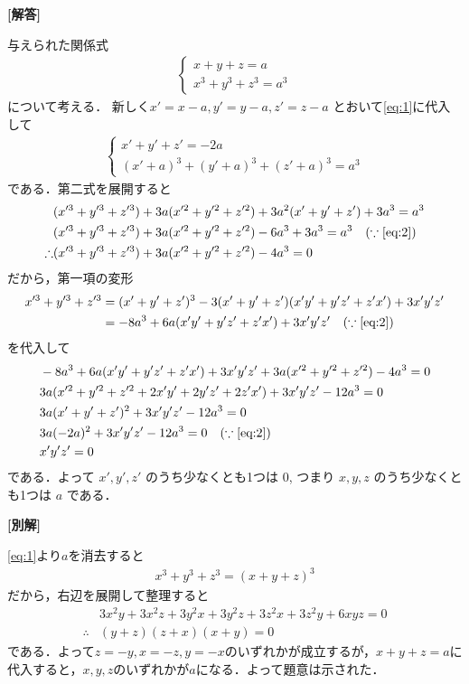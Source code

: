 \documentclass[../../main.tex]{subfiles}
\begin{document}
\begin{oframed}
  
\end{oframed}

{\bf [解答]}

与えられた関係式
\begin{align}
  \begin{cases}
    x + y + z = a \\
    x^3+y^3+z^3 = a^3
  \end{cases} \label{eq:1}
\end{align}
について考える．
新しく$x' = x-a, y' = y-a, z' = z-a$ とおいて\cref{eq:1}に代入して
\begin{align}
  \begin{cases}
    x' + y' + z' = -2a \\
    (x'+a)^3 + (y'+a)^3 + (z'+a)^3 = a^3
  \end{cases} \label{eq:2}
\end{align}
である．第二式を展開すると
\begin{align}
  & (x'^3+y'^3+z'^3) + 3a(x'^2+y'^2+z'^2)+3a^2(x'+y'+z')+3a^3 = a^3 \\
  & (x'^3+y'^3+z'^3) + 3a(x'^2+y'^2+z'^2)-6a^3+3a^3 = a^3 \quad (\because\text{\cref{eq:2}}) \\
  \therefore
  & (x'^3+y'^3+z'^3) + 3a(x'^2+y'^2+z'^2)-4a^3 = 0 \label{eq:3}
\end{align}
だから，第一項の変形
\begin{align}
  x'^3+y'^3+z'^3
  & = (x'+y'+z')^3 - 3(x'+y'+z')(x'y'+y'z'+z'x') + 3x'y'z' \\
  & = -8a^3 + 6a(x'y'+y'z'+z'x') + 3x'y'z' \quad (\because\text{\cref{eq:2}})
\end{align}
を代入して
\begin{align}
  & -8a^3 + 6a(x'y'+y'z'+z'x') + 3x'y'z' + 3a(x'^2+y'^2+z'^2)-4a^3 = 0 \\
  & 3a(x'^2+y'^2+z'^2+2x'y'+2y'z'+2z'x') + 3x'y'z' - 12a^3 = 0 \\
  & 3a(x'+y'+z')^2 + 3x'y'z' - 12a^3 = 0 \\
  & 3a(-2a)^2 + 3x'y'z' - 12a^3 = 0  \quad (\because\text{\cref{eq:2}}) \\
  & x'y'z' = 0
\end{align}
である．よって $x', y', z'$ のうち少なくとも1つは 0, つまり $x, y, z$ のうち少なくとも1つは $a$ である．

{\bf [別解]}

\cref{eq:1}より$a$を消去すると
\begin{align}
  x^3 + y^3 + z^3 = (x+y+z)^3
\end{align}
だから，右辺を展開して整理すると
\begin{align}
  & 3x^2 y + 3x^2 z + 3y^2 x + 3y^2 z + 3z^2 x + 3z^2 y + 6xyz = 0 \\
  \therefore
  & (y+z)(z+x)(x+y) = 0
\end{align}
である．よって$z=-y,x=-z,y=-x$のいずれかが成立するが，$x+y+z=a$に代入すると，$x,y,z$のいずれかが$a$になる．よって題意は示された．

\newpage
\end{document}
